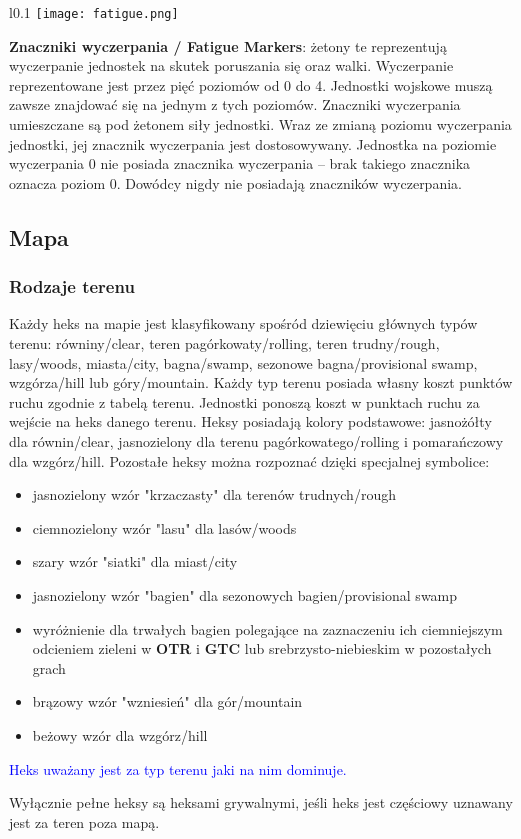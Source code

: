 \begin{wrapfigure}{l}{0.1\textwidth}
  \texttt{[image: fatigue.png]}
\end{wrapfigure}
\textbf{Znaczniki wyczerpania / Fatigue Markers}: żetony te reprezentują wyczerpanie jednostek na skutek poruszania się oraz walki. Wyczerpanie reprezentowane jest przez pięć poziomów od 0 do 4. Jednostki wojskowe muszą zawsze znajdować się na jednym z tych poziomów. Znaczniki wyczerpania umieszczane są pod żetonem siły jednostki. Wraz ze zmianą poziomu wyczerpania jednostki, jej znacznik wyczerpania jest dostosowywany. Jednostka na poziomie wyczerpania 0 nie posiada znacznika wyczerpania -- brak takiego znacznika oznacza poziom 0. Dowódcy nigdy nie posiadają znaczników wyczerpania.

\subsection{Mapa}
\subsubsection*{Rodzaje terenu}
Każdy heks na mapie jest klasyfikowany spośród dziewięciu głównych typów terenu: równiny/clear, teren pagórkowaty/rolling, teren trudny/rough, lasy/woods, miasta/city, bagna/swamp, sezonowe bagna/provisional swamp, wzgórza/hill lub góry/mountain. Każdy typ terenu posiada własny koszt punktów ruchu zgodnie z tabelą terenu. Jednostki ponoszą koszt w punktach ruchu za wejście na heks danego terenu. Heksy posiadają kolory podstawowe: jasnożółty dla równin/clear, jasnozielony dla terenu pagórkowatego/rolling i pomarańczowy dla wzgórz/hill. Pozostałe heksy można rozpoznać dzięki specjalnej symbolice:
\begin{itemize}
  \item jasnozielony wzór "krzaczasty" dla terenów trudnych/rough
  \item ciemnozielony wzór "lasu" dla lasów/woods
  \item szary wzór "siatki" dla miast/city
  \item jasnozielony wzór "bagien" dla sezonowych bagien/provisional swamp
  \item wyróżnienie dla trwałych bagien polegające na zaznaczeniu ich ciemniejszym odcieniem zieleni w \textbf{OTR} i \textbf{GTC} lub srebrzysto-niebieskim w pozostałych grach
  \item brązowy wzór "wzniesień" dla gór/mountain
  \item beżowy wzór dla wzgórz/hill
\end{itemize}
\textcolor{blue}{Heks uważany jest za typ terenu jaki na nim dominuje.}\par
Wyłącznie pełne heksy są heksami grywalnymi, jeśli heks jest częściowy uznawany jest za teren poza mapą.
